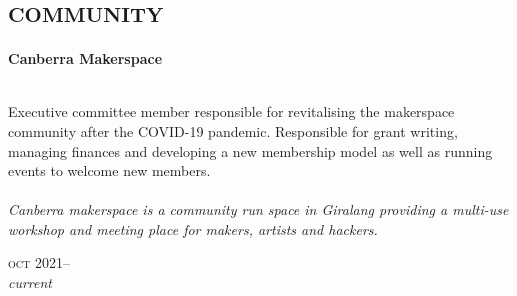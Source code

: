 
\section*{\textsc{community}}
\vspace{-0.2cm}

\begin{minipage}[t]{\mainboxwidth\textwidth}
\textbf{Canberra Makerspace}\\
\\
{\small
Executive committee member responsible for revitalising the makerspace community after the COVID-19 pandemic. Responsible for grant writing, managing finances and developing a new membership model as well as running events to welcome new members.
\\
\\
\textit{Canberra makerspace is a community run space in Giralang providing a multi-use workshop and meeting place for makers, artists and hackers.}
\par}
\end{minipage}
\begin{minipage}[t]{\detailboxwidth\textwidth}
{
\hfill \textsc{oct} 2021--\\ 
\hspace*{0pt} \hfill \textit{\small current}
\par
}
\end{minipage}
\\


